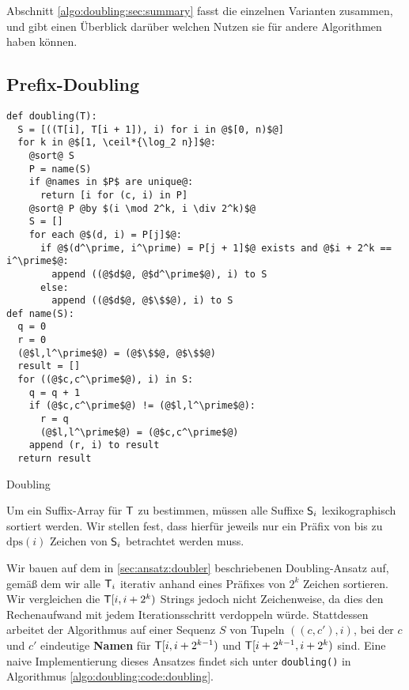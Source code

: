 Abschnitt \ref{algo:doubling:sec:summary} fasst die einzelnen Varianten zusammen, und gibt einen Überblick darüber welchen Nutzen sie für andere Algorithmen haben können.

\subsection{Prefix-Doubling}
\label{algo:doubling:sec:doubling}
\begin{listing}[htp]
\begin{verbatim}
def doubling(T):
  S = [((T[i], T[i + 1]), i) for i in @$[0, n)$@]
  for k in @$[1, \ceil*{\log_2 n}]$@:
    @sort@ S
    P = name(S)
    if @names in $P$ are unique@:
      return [i for (c, i) in P]
    @sort@ P @by $(i \mod 2^k, i \div 2^k)$@
    S = []
    for each @$(d, i) = P[j]$@:
      if @$(d^\prime, i^\prime) = P[j + 1]$@ exists and @$i + 2^k == i^\prime$@:
        append ((@$d$@, @$d^\prime$@), i) to S
      else:
        append ((@$d$@, @$\$$@), i) to S
def name(S):
  q = 0
  r = 0
  (@$l,l^\prime$@) = (@$\$$@, @$\$$@)
  result = []
  for ((@$c,c^\prime$@), i) in S:
    q = q + 1
    if (@$c,c^\prime$@) != (@$l,l^\prime$@):
      r = q
      (@$l,l^\prime$@) = (@$c,c^\prime$@)
    append (r, i) to result
  return result
\end{verbatim}
\caption{Doubling} 
\label{algo:doubling:code:doubling}
\end{listing}

 Um ein Suffix-Array für $\inputtext$ zu bestimmen, müssen alle Suffixe $\mathsf{S}_{i}$ lexikographisch sortiert werden. Wir stellen fest, dass hierfür jeweils nur ein Präfix von bis zu $\text{dps}(i)$ Zeichen von $\mathsf{S}_{i}$ betrachtet werden muss. 

Wir bauen auf dem in \cref{sec:ansatz:doubler} beschriebenen Doubling-Ansatz auf, gemäß dem wir alle $\inputtext_i$ iterativ anhand eines Präfixes von $2^k$ Zeichen sortieren. Wir vergleichen die $\inputtext{}[i, i + 2^k)$ Strings jedoch nicht Zeichenweise, da dies den Rechenaufwand mit jedem Iterationsschritt verdoppeln würde. Stattdessen arbeitet der Algorithmus auf einer Sequenz $S$ von Tupeln $((c, c'), i)$, bei der $c$ und $c'$ eindeutige \textbf{Namen} für $\inputtext{}[i, i + 2^{k-1})$ und $\inputtext{}[i + 2^{k-1}, i + 2^k)$ sind. Eine naive Implementierung dieses Ansatzes findet sich unter \texttt{doubling()} in Algorithmus \ref{algo:doubling:code:doubling}.

